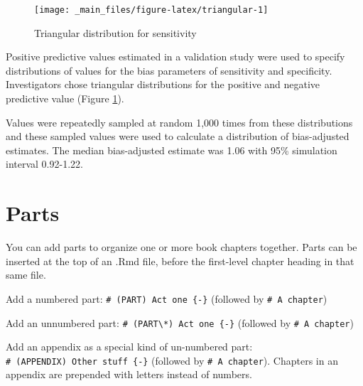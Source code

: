 \documentclass[
]{book}
\begin{document}
\begin{figure}

{\centering \texttt{[image: \_main\_files/figure-latex/triangular-1]} 

}

\caption{Triangular distribution for sensitivity}\label{fig:triangular}
\end{figure}

Positive predictive values estimated in a validation study were used to specify distributions of values for the bias parameters of sensitivity and specificity. Investigators chose triangular distributions for the positive and negative predictive value (Figure \ref{fig:triangular}).

Values were repeatedly sampled at random 1,000 times from these distributions and these sampled values were used to calculate a distribution of bias-adjusted estimates. The median bias-adjusted estimate was 1.06 with 95\% simulation interval 0.92-1.22.

\hypertarget{parts}{%
\chapter{Parts}\label{parts}}

You can add parts to organize one or more book chapters together. Parts can be inserted at the top of an .Rmd file, before the first-level chapter heading in that same file.

Add a numbered part: \texttt{\#\ (PART)\ Act\ one\ \{-\}} (followed by \texttt{\#\ A\ chapter})

Add an unnumbered part: \texttt{\#\ (PART\textbackslash{}*)\ Act\ one\ \{-\}} (followed by \texttt{\#\ A\ chapter})

Add an appendix as a special kind of un-numbered part: \texttt{\#\ (APPENDIX)\ Other\ stuff\ \{-\}} (followed by \texttt{\#\ A\ chapter}). Chapters in an appendix are prepended with letters instead of numbers.

  
\end{document}
